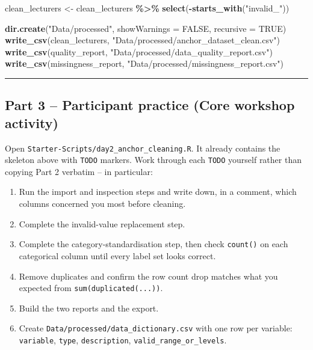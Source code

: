 \documentclass[11pt]{article}
\newenvironment{Shaded}{\begin{snugshade}}{\end{snugshade}}
\newcommand{\AttributeTok}[1]{\textcolor[rgb]{0.13,0.29,0.53}{#1}}
\newcommand{\ConstantTok}[1]{\textcolor[rgb]{0.56,0.35,0.01}{#1}}
\newcommand{\FunctionTok}[1]{\textcolor[rgb]{0.13,0.29,0.53}{\textbf{#1}}}
\newcommand{\NormalTok}[1]{#1}
\newcommand{\OtherTok}[1]{\textcolor[rgb]{0.56,0.35,0.01}{#1}}
\newcommand{\SpecialCharTok}[1]{\textcolor[rgb]{0.81,0.36,0.00}{\textbf{#1}}}
\newcommand{\StringTok}[1]{\textcolor[rgb]{0.31,0.60,0.02}{#1}}
\providecommand{\tightlist}{%
  \setlength{\itemsep}{0pt}\setlength{\parskip}{0pt}}
\begin{document}
\begin{Shaded}
\begin{Highlighting}[]
\NormalTok{clean\_lecturers }\OtherTok{\textless{}{-}}\NormalTok{ clean\_lecturers }\SpecialCharTok{\%\textgreater{}\%} \FunctionTok{select}\NormalTok{(}\SpecialCharTok{{-}}\FunctionTok{starts\_with}\NormalTok{(}\StringTok{"invalid\_"}\NormalTok{))}

\FunctionTok{dir.create}\NormalTok{(}\StringTok{"Data/processed"}\NormalTok{, }\AttributeTok{showWarnings =} \ConstantTok{FALSE}\NormalTok{, }\AttributeTok{recursive =} \ConstantTok{TRUE}\NormalTok{)}
\FunctionTok{write\_csv}\NormalTok{(clean\_lecturers, }\StringTok{"Data/processed/anchor\_dataset\_clean.csv"}\NormalTok{)}
\FunctionTok{write\_csv}\NormalTok{(quality\_report, }\StringTok{"Data/processed/data\_quality\_report.csv"}\NormalTok{)}
\FunctionTok{write\_csv}\NormalTok{(missingness\_report, }\StringTok{"Data/processed/missingness\_report.csv"}\NormalTok{)}
\end{Highlighting}
\end{Shaded}

\begin{center}\rule{0.5\linewidth}{0.5pt}\end{center}

\hypertarget{part-3-participant-practice-core-workshop-activity}{%
\subsection{Part 3 -- Participant practice (Core workshop
activity)}\label{part-3-participant-practice-core-workshop-activity}}

Open \texttt{Starter-Scripts/day2\_anchor\_cleaning.R}. It already
contains the skeleton above with \texttt{TODO} markers. Work through
each \texttt{TODO} yourself rather than copying Part 2 verbatim -- in
particular:

\begin{enumerate}
\def\labelenumi{\arabic{enumi}.}
\tightlist
\item
  Run the import and inspection steps and write down, in a comment,
  which columns concerned you most before cleaning.
\item
  Complete the invalid-value replacement step.
\item
  Complete the category-standardisation step, then check
  \texttt{count()} on each categorical column until every label set
  looks correct.
\item
  Remove duplicates and confirm the row count drop matches what you
  expected from \texttt{sum(duplicated(...))}.
\item
  Build the two reports and the export.
\item
  Create \texttt{Data/processed/data\_dictionary.csv} with one row per
  variable: \texttt{variable}, \texttt{type}, \texttt{description},
  \texttt{valid\_range\_or\_levels}.
\end{enumerate}
\end{document}
